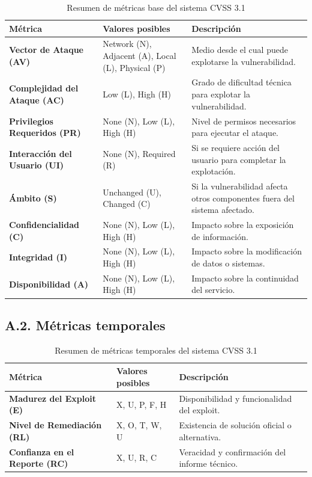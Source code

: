 \documentclass[a4paper, 11pt]{article}
\begin{document}
\begin{table}[H]
\centering
\caption{Resumen de métricas base del sistema CVSS 3.1}
\label{tab:cvss_base_metrics}
\begin{tabular}{|p{4.5cm}|p{3.5cm}|p{7cm}|}
\hline
\rowcolor{gray!30}
\textbf{Métrica} & \textbf{Valores posibles} & \textbf{Descripción} \\ \hline
\textbf{Vector de Ataque (AV)} & Network (N), Adjacent (A), Local (L), Physical (P) & Medio desde el cual puede explotarse la vulnerabilidad. \\ \hline
\textbf{Complejidad del Ataque (AC)} & Low (L), High (H) & Grado de dificultad técnica para explotar la vulnerabilidad. \\ \hline
\textbf{Privilegios Requeridos (PR)} & None (N), Low (L), High (H) & Nivel de permisos necesarios para ejecutar el ataque. \\ \hline
\textbf{Interacción del Usuario (UI)} & None (N), Required (R) & Si se requiere acción del usuario para completar la explotación. \\ \hline
\textbf{Ámbito (S)} & Unchanged (U), Changed (C) & Si la vulnerabilidad afecta otros componentes fuera del sistema afectado. \\ \hline
\textbf{Confidencialidad (C)} & None (N), Low (L), High (H) & Impacto sobre la exposición de información. \\ \hline
\textbf{Integridad (I)} & None (N), Low (L), High (H) & Impacto sobre la modificación de datos o sistemas. \\ \hline
\textbf{Disponibilidad (A)} & None (N), Low (L), High (H) & Impacto sobre la continuidad del servicio. \\ \hline
\end{tabular}
\end{table}

\vspace{1cm}

\subsection*{A.2. Métricas temporales}

\begin{table}[H]
\centering
\caption{Resumen de métricas temporales del sistema CVSS 3.1}
\label{tab:cvss_temporal_metrics}
\begin{tabular}{|p{4.5cm}|p{3.5cm}|p{7cm}|}
\hline
\rowcolor{gray!30}
\textbf{Métrica} & \textbf{Valores posibles} & \textbf{Descripción} \\ \hline
\textbf{Madurez del Exploit (E)} & X, U, P, F, H & Disponibilidad y funcionalidad del exploit. \\ \hline
\textbf{Nivel de Remediación (RL)} & X, O, T, W, U & Existencia de solución oficial o alternativa. \\ \hline
\textbf{Confianza en el Reporte (RC)} & X, U, R, C & Veracidad y confirmación del informe técnico. \\ \hline
\end{tabular}
\end{table}
\end{document}
